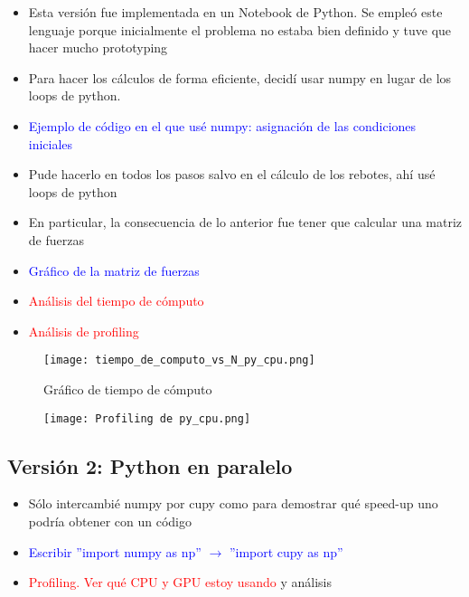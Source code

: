 \documentclass[aps,prb,twocolumn,superscriptaddress,floatfix,longbibliography]{revtex4-2}
\newcounter{para}
\begin{document}
\begin{itemize}
\begin{itemize}
    \item Esta versión fue implementada en un Notebook de Python. Se empleó este lenguaje porque inicialmente el problema no estaba bien definido y tuve que hacer mucho prototyping
    \item Para hacer los cálculos de forma eficiente, decidí usar numpy en lugar de los loops de python.
    \item \textcolor{blue}{Ejemplo de código en el que usé numpy: asignación de las condiciones iniciales}
    \item Pude hacerlo en todos los pasos salvo en el cálculo de los rebotes, ahí usé loops de python
    \item En particular, la consecuencia de lo anterior fue tener que calcular una matriz de fuerzas
    \item \textcolor{blue}{Gráfico de la matriz de fuerzas}
    \item \textcolor{red}{Análisis del tiempo de cómputo}
    \item \textcolor{red}{Análisis de profiling}
\end{itemize}


\begin{figure}[h]
    \texttt{[image: tiempo\_de\_computo\_vs\_N\_py\_cpu.png]}
    \caption{Gráfico de tiempo de cómputo}
     \label{fig:tiempo_de_computo_vs_N_py_cpu}
\end{figure}

\begin{figure}[h]
    \texttt{[image: Profiling de py\_cpu.png]}
    \caption{}
     \label{fig:Profiling de py_cpu}
\end{figure}


\subsection{Versión 2: Python en paralelo}

\begin{itemize}
    \item Sólo intercambié numpy por cupy como para demostrar qué speed-up uno podría obtener con un código 
    \item \textcolor{blue}{Escribir ''import numpy as np'' $\rightarrow$ ''import cupy as np''}
    \item \textcolor{red}{Profiling. Ver qué CPU y GPU estoy usando} y análisis
\end{itemize}


\end{itemize}
\end{document}
